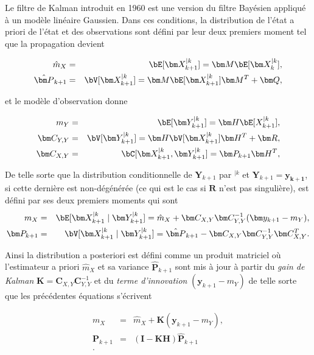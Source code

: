 Le filtre de Kalman introduit en 1960 \cite{kalman_new_1960} est une version du filtre Bayésien appliqué à un modèle linéaire Gaussien. Dans ces conditions, la distribution de l'état a priori de l'état et des observations sont défini par leur deux premiers moment tel que la propagation devient

\begin{eqnarray*}
    \hat m_X &=& \bE [\bm X_{k+1}^{\mid k}] = \bm M \bE [\bm X_{k}^{\mid k}],\\
    \hat{\bm  P}_{k+1} &=& \bV [\bm X_{k+1}^{\mid k}] = \bm M \bE [\bm X_{k+1}^{\mid k}] \bm M^T + \bm Q,
\end{eqnarray*}

et le modèle d'observation donne

\begin{eqnarray*}
    m_Y &=& \bE [\bm Y_{k+1}^{\mid k}] = \bm H \bE [X_{k+1}^{\mid k}],\\
    \bm C_{Y,Y}&=&\bV [\bm Y_{k+1}^{\mid k}] = \bm H \bV [\bm X_{k+1}^{\mid k}] \bm H^T + \bm R, \\
    \bm C_{X,Y} &=& \bC[\bm X_{k+1}^{\mid k},\bm Y^{\mid k}_{k+1}] = \bm P_{k+1} \bm H^T,
\end{eqnarray*}

De telle sorte que la distribution conditionnelle de $\bm Y_{k+1}$ par $^{\mid k}$ et $\bm Y_{k+1} = \bm{y_{k+1}}$, si cette dernière est non-dégénérée (ce qui est le cas si $\bm R$ n'est pas singulière), est défini par ses deux premiers moments qui sont
\begin{eqnarray*}
    m_X &=& \bE[\bm X^{\mid k}_{k+1} \mid \bm Y_{k+1}^{\mid k}] = \hat m_X + \bm C_{X,Y} \bm C_{Y,Y}^{-1} (\bm y_{k+1} - m_Y), \\
    \bm P_{k+1} &=& \bV[\bm X^{\mid k}_{k+1} \mid \bm Y_{k+1}^{\mid k}] = \hat{\bm  P}_{k+1} - \bm C_{X,Y} \bm C_{Y,Y}^{-1} \bm C_{X,Y}^T.
\end{eqnarray*}

Ainsi la distribution a posteriori est défini comme un produit matriciel où l'estimateur a priori $\hat m_X$ et sa variance $\hat{\bm  P}_{k+1}$ sont mis à jour à partir du \textit{gain de Kalman} $\bm K = \bm C_{X,Y} \bm C_{Y,Y}^{-1} $ et du \textit{terme d'innovation} $(\bm y_{k+1} - m_Y)$ de telle sorte que les précédentes équations s'écrivent

\begin{eqnarray*}
    m_X &=& \hat m_X + \bm K (\bm y_{k+1} - m_Y), \\
    \bm P_{k+1} &=& (\bm I - \bm K\bm H)\hat{\bm  P}_{k+1} \\.
\end{eqnarray*}

